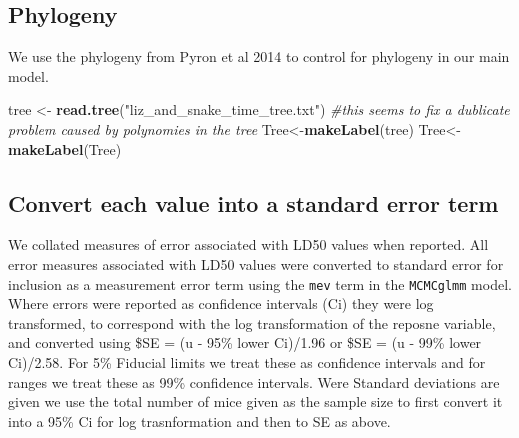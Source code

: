 \documentclass[]{article}
\newenvironment{Shaded}{\begin{snugshade}}{\end{snugshade}}
\newcommand{\KeywordTok}[1]{\textcolor[rgb]{0.13,0.29,0.53}{\textbf{#1}}}
\newcommand{\StringTok}[1]{\textcolor[rgb]{0.31,0.60,0.02}{#1}}
\newcommand{\CommentTok}[1]{\textcolor[rgb]{0.56,0.35,0.01}{\textit{#1}}}
\newcommand{\NormalTok}[1]{#1}
\begin{document}
\subsection{Phylogeny}\label{phylogeny}

We use the phylogeny from Pyron et al 2014 to control for phylogeny in
our main model.

\begin{Shaded}
\begin{Highlighting}[]
\NormalTok{tree <-}\StringTok{ }\KeywordTok{read.tree}\NormalTok{(}\StringTok{"liz_and_snake_time_tree.txt"}\NormalTok{)}
\CommentTok{#this seems to fix a dublicate problem caused by polynomies in the tree}
\NormalTok{Tree<-}\KeywordTok{makeLabel}\NormalTok{(tree)}
\NormalTok{Tree<-}\KeywordTok{makeLabel}\NormalTok{(Tree)}
\end{Highlighting}
\end{Shaded}

\subsection{Convert each value into a standard error
term}\label{convert-each-value-into-a-standard-error-term}

We collated measures of error associated with LD50 values when reported.
All error measures associated with LD50 values were converted to
standard error for inclusion as a measurement error term using the
\texttt{mev} term in the \texttt{MCMCglmm} model. Where errors were
reported as confidence intervals (Ci) they were log transformed, to
correspond with the log transformation of the reposne variable, and
converted using \$SE = (u - 95\% lower Ci)/1.96 or \$SE = (u - 99\%
lower Ci)/2.58. For 5\% Fiducial limits we treat these as confidence
intervals and for ranges we treat these as 99\% confidence intervals.
Were Standard deviations are given we use the total number of mice given
as the sample size to first convert it into a 95\% Ci for log
trasnformation and then to SE as above.
\end{document}
